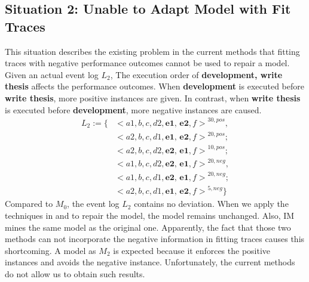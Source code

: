\subsection{Situation 2: \small{Unable to Adapt Model with Fit Traces}}
This situation describes the existing problem in the current methods that fitting traces with negative performance outcomes cannot be used to repair a model. Given an actual event log $L_2$, The execution order of \textbf{development, write thesis} affects the performance outcomes. When \textbf{development} is executed before \textbf{write thesis}, more positive instances are given. In contrast, when \textbf{write thesis} is executed before \textbf{development}, more negative instances are caused. 
\begin{align*}
L_2:=\{ & { < a1, b, c, d2, \textbf{e1, e2}, f>}^{30, pos} , \\   
&{< a2, b, c, d1, \textbf{e1, e2}, f>}^{20, pos};   \\
&{< a2, b, c, d2, \textbf{e2, e1}, f>}^{10, pos}; \\
& {< a1, b, c, d2, \textbf{e2, e1}, f>}^{20, neg} , \\
&{< a1, b, c, d1, \textbf{e2, e1}, f>}^{20, neg}; \\
& {<a2, b, c, d1, \textbf{e1, e2}, f>}^{5, neg}  \}
\end{align*}
Compared to $M_0$, the event log $L_2$ contains no deviation. When we apply the techniques in  \cite{fahland2015model} and  \cite{dees2017enhancing} to repair the model, the model remains unchanged. Also, IM mines the same model as the original one. Apparently, the fact that those two methods can not incorporate the negative information in fitting traces causes this shortcoming. A model as $M_2$ is expected because it enforces the positive instances and avoids the negative instance. Unfortunately, the current methods do not allow us to obtain such results. 
